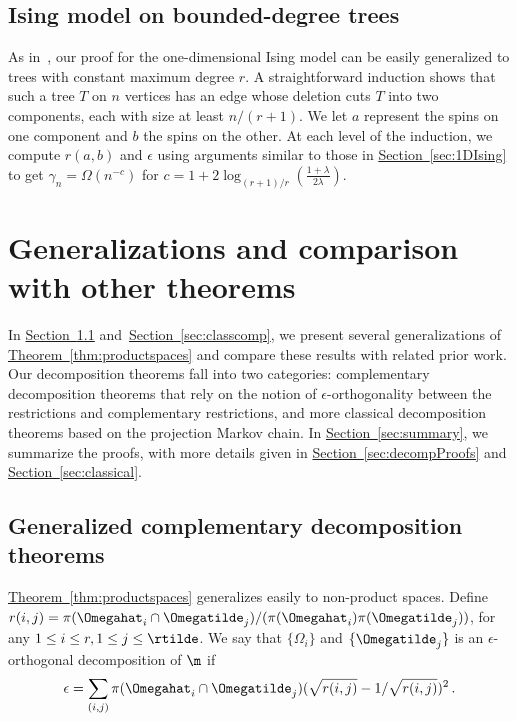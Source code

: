 \documentclass[11pt]{article}
\providecommand{\expref}[2]{\texorpdfstring{\hyperref[#2]{#1~\ref{#2}}}{#1~\ref{#2}}}
\begin{document}
%
\subsection{Ising model on bounded-degree trees}  %

As in~\cite{jstv04}, our proof for the one-dimensional Ising model can 
be easily generalized to trees with constant maximum degree $r$.  A 
straightforward induction shows that such a tree $T$ on $n$ vertices 
has an edge whose deletion cuts $T$ into two components, each with size 
at least $n/(r+1)$. We let $a$ represent the spins on one component and 
$b$ the spins on the other. At each level of the induction, we compute 
$r(a,b)$ and $\epsilon$ using arguments similar to those in 
\expref{Section}{sec:1DIsing} to get $\gamma_n = \Omega(n^{-c})$ for $c = 1 
+ 2\log_{(r+1)/r}\left(\frac{1+\lambda}{2\lambda}\right)$. 

\section{Generalizations and comparison with other theorems}\label{sec:generalizations}

In \expref{Section}{sec:gencomp} and~\expref{Section}{sec:classcomp}, we present 
several generalizations of \expref{Theorem}{thm:productspaces} and compare 
these results with related prior work.  Our decomposition theorems fall 
into two categories: complementary decomposition theorems that rely on 
the notion of $\epsilon$-orthogonality between the restrictions and 
complementary restrictions, and more classical decomposition theorems 
based on the projection Markov chain.  In \expref{Section}{sec:summary}, we 
summarize the proofs, with more details given in \expref{Section}{sec:decompProofs} and \expref{Section}{sec:classical}.

\subsection{Generalized complementary decomposition theorems}\label{sec:gencomp}

\expref{Theorem}{thm:productspaces} generalizes easily to non-product spaces.  
Define $r(i,j)=\pi(\Omegahat_i\cap\Omegatilde_j)/(\pi(\Omegahat_i)\pi(\Omegatilde_j))$, 
for any $1\leq i\leq r, 1\leq j\leq \rtilde$.
We say that $\{\Omega_i\}$ and $\{\Omegatilde_j\}$
is an $\epsilon$-orthogonal decomposition of $\m$ if
\begin{equation*}
  \epsilon=  \sum_{(i,j)}\pi(\Omegahat_i\cap\Omegatilde_j)(\sqrt{r(i,j)}-1/\sqrt{r(i,j)})^2\,.
\end{equation*}
\end{document}

